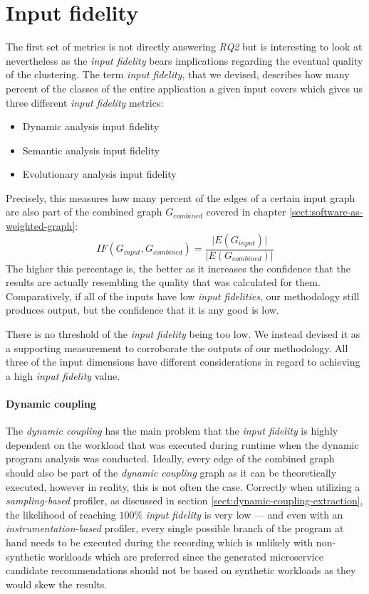 \documentclass[12pt,a4paper]{report}
\begin{document}
\section{Input fidelity} \label{sect:input-fidelity-metrics}

The first set of metrics is not directly answering \textit{RQ2} but is
interesting to look at nevertheless as the \textit{input fidelity} bears
implications regarding the eventual quality of the clustering. The term \textit{
input fidelity}, that we devised, describes how many percent of the classes of
the entire application a given input covers which gives us three different
\textit{input fidelity} metrics:
\begin{itemize}[noitemsep]
  \item Dynamic analysis input fidelity
  \item Semantic analysis input fidelity
  \item Evolutionary analysis input fidelity
\end{itemize}

Precisely, this measures how many percent of the edges of a certain input graph
are also part of the combined graph \(G_{combined}\) covered in chapter
\ref{sect:software-as-weighted-graph}:
\[
  IF(G_{input}, G_{combined}) = \frac{\vert E(G_{input}) \vert}{\vert E(G_{combined}) \vert}
\]
The higher this percentage
is, the better as it increases the confidence that the results are actually
resembling the quality that was calculated for them. Comparatively, if all of
the inputs have low \textit{input fidelities}, our methodology still produces
output, but the confidence that it is any good is low.

There is no threshold of the \textit{input fidelity} being too low. We instead
devised it as a supporting measurement to corroborate the outputs of our
methodology. All three of the input dimensions have different considerations in
regard to achieving a high \textit{input fidelity} value.

\paragraph{Dynamic coupling}
The \textit{dynamic coupling} has the main problem
that the \textit{input fidelity} is highly dependent on the workload that was
executed during runtime when the dynamic program analysis was conducted.
Ideally, every edge of the combined graph should also be part of the \textit{
dynamic coupling} graph as it can be theoretically executed, however in
reality, this is not often the case. Correctly when utilizing a \textit{
sampling\hyp based} profiler, as discussed in section
\ref{sect:dynamic-coupling-extraction}, the likelihood of reaching \(100\%\)
\textit{input fidelity} is very low --- and even with an \textit{instrumentation\hyp based}
profiler, every single possible branch of the program at hand needs to be
executed during the recording which is unlikely with non\hyp synthetic
workloads which are preferred since the generated microservice candidate
recommendations should not be based on synthetic workloads as they would skew
the results.
\end{document}
